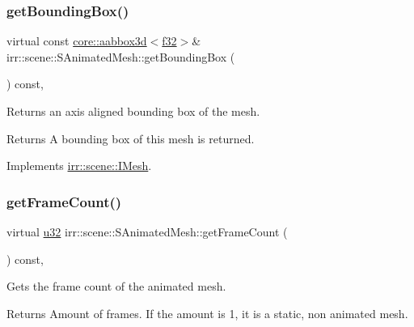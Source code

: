 \subsubsection{\texorpdfstring{get\+Bounding\+Box()}{getBoundingBox()}}
{\footnotesize\ttfamily virtual const \hyperlink{classirr_1_1core_1_1aabbox3d}{core\+::aabbox3d}$<$\hyperlink{namespaceirr_a0277be98d67dc26ff93b1a6a1d086b07}{f32}$>$\& irr\+::scene\+::\+S\+Animated\+Mesh\+::get\+Bounding\+Box (\begin{DoxyParamCaption}{ }\end{DoxyParamCaption}) const\hspace{0.3cm}{\ttfamily [inline]}, {\ttfamily [virtual]}}



Returns an axis aligned bounding box of the mesh. 

\begin{DoxyReturn}{Returns}
A bounding box of this mesh is returned. 
\end{DoxyReturn}


Implements \hyperlink{classirr_1_1scene_1_1IMesh_ada6ecee9cbebed8bb67fd92872552ea0}{irr\+::scene\+::\+I\+Mesh}.

\mbox{\label{structirr_1_1scene_1_1SAnimatedMesh_a58d8940d3002792194c74e209a5f2949}} 
\subsubsection{\texorpdfstring{get\+Frame\+Count()}{getFrameCount()}}
{\footnotesize\ttfamily virtual \hyperlink{namespaceirr_a0416a53257075833e7002efd0a18e804}{u32} irr\+::scene\+::\+S\+Animated\+Mesh\+::get\+Frame\+Count (\begin{DoxyParamCaption}{ }\end{DoxyParamCaption}) const\hspace{0.3cm}{\ttfamily [inline]}, {\ttfamily [virtual]}}



Gets the frame count of the animated mesh. 

\begin{DoxyReturn}{Returns}
Amount of frames. If the amount is 1, it is a static, non animated mesh. 
\end{DoxyReturn}


